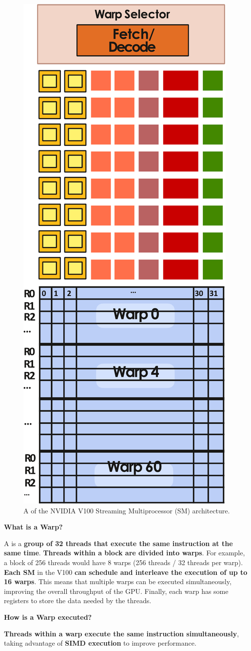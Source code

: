 \newpage

\begin{figure}[!htp]
    \centering
    \includegraphics[width=.4\textwidth]{img/nvidia-v100-sm-1.pdf}
    \caption{A  of the NVIDIA V100 Streaming Multiprocessor (SM) architecture.}
    \label{fig: A sub-core of the NVIDIA V100 Streaming Multiprocessor (SM) architecture}
\end{figure}

\begin{flushleft}
    \textcolor{Green3}{ \textbf{What is a Warp?}}
\end{flushleft}
A  is a \textbf{group of 32 threads that execute the same instruction at the same time}. \textbf{Threads within a block are divided into warps}. For example, a block of 256 threads would have 8 warps (256 threads / 32 threads per warp). \textbf{Each SM} in the V100 \textbf{can schedule and interleave the execution of up to 16 warps}. This means that multiple warps can be executed simultaneously, improving the overall throughput of the GPU. Finally, each warp has some registers to store the data needed by the threads.

\newpage

\begin{flushleft}
    \textcolor{Green3}{ \textbf{How is a Warp executed?}}
\end{flushleft}
\textbf{Threads within a warp execute the same instruction simultaneously}, taking advantage of \textbf{SIMD execution} to improve performance. 

